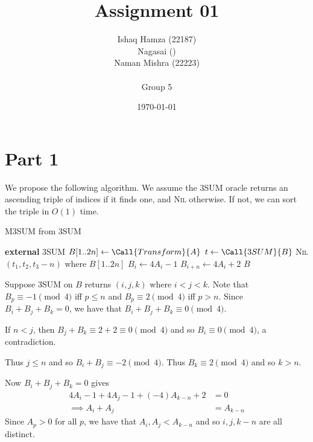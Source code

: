 \documentclass[12pt]{article}
\title{Assignment 01}
\author{Ishaq Hamza (22187) \\
Nagasai () \\
Naman Mishra (22223) \\\\
Group 5}
\date{\today}
\begin{document}
\maketitle

\section{Part 1} \label{sec:part_1}

\begin{problem} \label{prb:m3sum}
\end{problem}
\begin{solution}
    We propose the following algorithm.
    We assume the \textsc{3SUM} oracle returns an ascending triple of indices
    if it finds one, and \textsc{Nil} otherwise.
    If not, we can sort the triple in $O(1)$ time.
    \begin{algorithm}[H]
        \caption{\textsc{M3SUM} from \textsc{3SUM}} \label{alg:m3sum}
        \begin{algorithmic}[1]
            \State \textbf{external} \textsc{3SUM}
                \State $B[1..2n] \gets \Call{Transform}{A}$
                \State $t \gets \Call{3SUM}{B}$
                    \State \Return \textsc{Nil}
                \Else
                    \State \Return $(t_1, t_2, t_3 - n)$
                \EndIf
            \EndFunction
            \Statex where
                \State $B[1..2n]$
                    \State $B_{i} \gets 4 A_{i} - 1$
                    \State $B_{i + n} \gets 4 A_{i} + 2$
                \EndFor
                \State \Return $B$
            \EndFunction
        \end{algorithmic}
    \end{algorithm}
    Suppose \textsc{3SUM} on $B$ returns $(i, j, k)$ where $i < j < k$.
    Note that $B_{p} \equiv -1 \pmod{4}$ iff $p \leq n$ and
    $B_{p} \equiv 2 \pmod{4}$ iff $p > n$.
    Since $B_{i} + B_{j} + B_{k} = 0$, we have that
    $B_{i} + B_{j} + B_{k} \equiv 0 \pmod{4}$.

    If $n < j$, then $B_{j} + B_{k} \equiv 2 + 2 \equiv 0 \pmod{4}$ and so
    $B_{i} \equiv 0 \pmod{4}$, a contradiction.
    
    Thus $j \leq n$ and so $B_{i} + B_{j} \equiv -2 \pmod{4}$.
    Thus $B_{k} \equiv 2 \pmod{4}$ and so $k > n$.

    Now $B_{i} + B_{j} + B_{k} = 0$ gives
    \begin{align*}
        4 A_{i} - 1 + 4 A_{j} - 1 + (-4) A_{k-n} + 2 &= 0 \\
        \implies A_{i} + A_{j} &= A_{k-n}
    \end{align*}
    Since $A_{p} > 0$ for all $p$, we have that $A_{i}, A_{j} < A_{k-n}$ and so
    $i, j, k - n$ are all distinct.


\end{solution}
\end{document}
